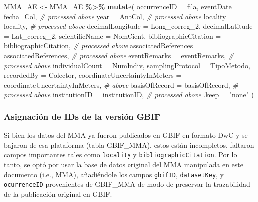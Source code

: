 \documentclass[sn-apa,pdflatex]{sn-jnl}
\newenvironment{Shaded}{\begin{snugshade}}{\end{snugshade}}
\newcommand{\AttributeTok}[1]{\textcolor[rgb]{0.13,0.29,0.53}{#1}}
\newcommand{\CommentTok}[1]{\textcolor[rgb]{0.56,0.35,0.01}{\textit{#1}}}
\newcommand{\FunctionTok}[1]{\textcolor[rgb]{0.13,0.29,0.53}{\textbf{#1}}}
\newcommand{\NormalTok}[1]{#1}
\newcommand{\OtherTok}[1]{\textcolor[rgb]{0.56,0.35,0.01}{#1}}
\newcommand{\SpecialCharTok}[1]{\textcolor[rgb]{0.81,0.36,0.00}{\textbf{#1}}}
\newcommand{\StringTok}[1]{\textcolor[rgb]{0.31,0.60,0.02}{#1}}
\begin{document}
\begin{Shaded}
\begin{Highlighting}[]
\NormalTok{MMA\_AE }\OtherTok{\textless{}{-}}\NormalTok{ MMA\_AE }\SpecialCharTok{\%\textgreater{}\%} \FunctionTok{mutate}\NormalTok{( }
         \AttributeTok{occurrenceID          =}\NormalTok{ fila,      }
         \AttributeTok{eventDate             =}\NormalTok{ fecha\_Col, }\CommentTok{\# processed above}
         \AttributeTok{year                  =}\NormalTok{ AnoCol,    }\CommentTok{\# processed above}
         \AttributeTok{locality              =}\NormalTok{ locality,  }\CommentTok{\# processed above}
         \AttributeTok{decimalLongitude      =}\NormalTok{ Long\_correg\_2,}
         \AttributeTok{decimalLatitude       =}\NormalTok{ Lat\_correg\_2,}
         \AttributeTok{scientificName        =}\NormalTok{ NomCient,}
         \AttributeTok{bibliographicCitation =}\NormalTok{ bibliographicCitation, }\CommentTok{\# processed above}
         \AttributeTok{associatedReferences  =}\NormalTok{ associatedReferences,  }\CommentTok{\# processed above}
         \AttributeTok{eventRemarks          =}\NormalTok{ eventRemarks,          }\CommentTok{\# processed above}
         \AttributeTok{individualCount       =}\NormalTok{ NumIndiv,}
         \AttributeTok{samplingProtocol      =}\NormalTok{ TipoMetodo,}
         \AttributeTok{recordedBy            =}\NormalTok{ Colector,}
         \AttributeTok{coordinateUncertaintyInMeters =}\NormalTok{ coordinateUncertaintyInMeters, }\CommentTok{\# above}
         \AttributeTok{basisOfRecord         =}\NormalTok{ basisOfRecord, }\CommentTok{\# processed above}
         \AttributeTok{institutionID         =}\NormalTok{ institutionID, }\CommentTok{\# processed above}
                \AttributeTok{.keep =} \StringTok{"none"}\NormalTok{ )}
\end{Highlighting}
\end{Shaded}

\subsubsection{Asignación de IDs de la versión
GBIF}\label{asignaciuxf3n-de-ids-de-la-versiuxf3n-gbif}

Si bien los datos del MMA ya fueron publicados en GBIF en formato DwC y
se bajaron de esa plataforma (tabla GBIF\_MMA), estos están incompletos,
faltaron campos importantes tales como \texttt{locality} y
\texttt{bibliographicCitation}. Por lo tanto, se optó por usar la base
de datos original del MMA manipulada en este documento (i.e., MMA),
añadiéndole los campos \texttt{gbifID}, \texttt{datasetKey}, y
\texttt{ocurrenceID} provenientes de GBIF\_MMA de modo de preservar la
trazabilidad de la publicación original en GBIF.
\end{document}

